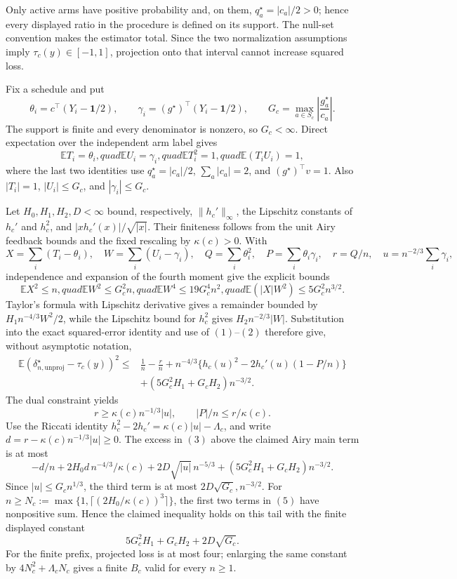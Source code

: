 Only active arms have positive probability and, on them,
\(q_a^\star=|c_a|/2>0\); hence every displayed ratio in the procedure is defined on its support.  The null-set convention makes the estimator total.  Since the two normalization assumptions imply \(\tau_c(y)\in[-1,1]\), projection onto that interval cannot increase squared loss.

Fix a schedule and put
\[
\theta_i=c^\top(Y_i-\mathbf1/2),\qquad
\gamma_i=(g^\star)^\top(Y_i-\mathbf1/2),
\qquad G_c=\max_{a\in S_c}\left|\frac{g_a^\star}{c_a}\right|.
\]
The support is finite and every denominator is nonzero, so \(G_c<\infty\).  Direct expectation over the independent arm label gives
\[
\mathbb ET_i=\theta_i,quad \mathbb EU_i=\gamma_i,quad
\mathbb ET_i^2=1,quad \mathbb E(T_iU_i)=1,
\tag{1}
\]
where the last two identities use \(q_a^\star=|c_a|/2\),
\(\sum_a|c_a|=2\), and \((g^\star)^\top v=1\).  Also
\(|T_i|=1\), \(|U_i|\le G_c\), and \(|\gamma_i|\le G_c\).

Let \(H_0,H_1,H_2,D<\infty\) bound, respectively,
\(\|h_c'\|_\infty\), the Lipschitz constants of \(h_c'\) and \(h_c^2\), and
\(|xh_c'(x)|/\sqrt{|x|}\).  Their finiteness follows from the unit Airy feedback bounds and the fixed rescaling by \(\kappa(c)>0\).  With
\[
X=\sum_i(T_i-\theta_i),\quad W=\sum_i(U_i-\gamma_i),
\quad Q=\sum_i\theta_i^2,\quad P=\sum_i\theta_i\gamma_i,
\quad r=Q/n,\quad u=n^{-2/3}\sum_i\gamma_i,
\]
independence and expansion of the fourth moment give the explicit bounds
\[
\mathbb EX^2\le n,quad \mathbb EW^2\le G_c^2n,quad
\mathbb EW^4\le19G_c^4n^2,quad
\mathbb E(|X|W^2)\le5G_c^2n^{3/2}.
\tag{2}
\]
Taylor's formula with Lipschitz derivative gives a remainder bounded by
\(H_1n^{-4/3}W^2/2\), while the Lipschitz bound for \(h_c^2\) gives
\(H_2n^{-2/3}|W|\).  Substitution into the exact squared-error identity and use of \((1)\)--\((2)\) therefore give, without asymptotic notation,
\[
\begin{aligned}
\mathbb E(\delta_{n,\mathrm{unproj}}^\star-\tau_c(y))^2
\le{}&\frac1n-\frac rn+n^{-4/3}
\{h_c(u)^2-2h_c'(u)(1-P/n)\}\\
&+(5G_c^2H_1+G_cH_2)n^{-3/2}.
\end{aligned}
\tag{3}
\]
The dual constraint yields
\[
r\ge\kappa(c)n^{-1/3}|u|,\qquad |P|/n\le r/\kappa(c).
\tag{4}
\]
Use the Riccati identity
\(h_c^2-2h_c'=\kappa(c)|u|-\Lambda_c\), and write
\(d=r-\kappa(c)n^{-1/3}|u|\ge0\).  The excess in \((3)\) above the claimed Airy main term is at most
\[
-d/n+2H_0d\,n^{-4/3}/\kappa(c)
+2D\sqrt{|u|}\,n^{-5/3}
+(5G_c^2H_1+G_cH_2)n^{-3/2}.
\tag{5}
\]
Since \(|u|\le G_cn^{1/3}\), the third term is at most
\(2D\sqrt{G_c},n^{-3/2}\).  For
\(n\ge N_c:=\max\{1,\lceil(2H_0/\kappa(c))^3\rceil\}\), the first two terms in \((5)\) have nonpositive sum.  Hence the claimed inequality holds on this tail with the finite displayed constant
\[
5G_c^2H_1+G_cH_2+2D\sqrt{G_c}.
\]
For the finite prefix, projected loss is at most four; enlarging the same constant by
\(4N_c^2+\Lambda_cN_c\) gives a finite \(B_c\) valid for every \(n\ge1\).

